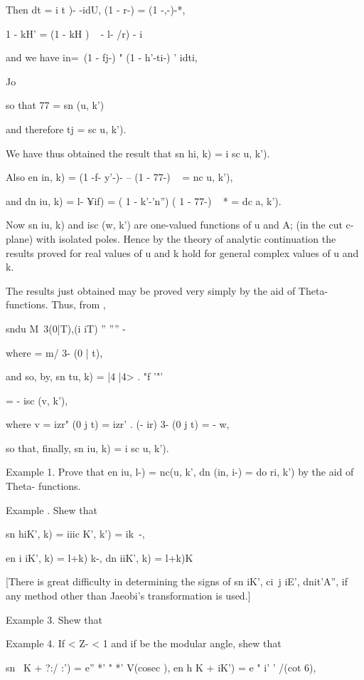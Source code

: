 Then dt = i t )- -idU, (1 - r-) = (1 -,-)-*,

1 - kH' = (1 - kH ) ~ - l- /r) - i

and we have in=\ (1 - fj-) " (1 - h'-ti-) ' idti,

Jo

so that 77 = sn (u, k')

and therefore tj = sc u, k').

We have thus obtained the result that sn hi, k) = i sc u, k').

Also en in, k) = (1 -f- y'-)- -- (1 - 77-) ~ = nc u, k'),

and dn iu, k) = l- ¥if) = ( 1 - k'-'n'') ( 1 - 77-) ~ * = dc a, k').

Now sn iu, k) and isc (w, k') are one-valued functions of u and A; (in
the cut c-plane) with isolated poles. Hence by the theory of analytic
continuation the results proved for real values of u and k hold for
general complex values of u and k.


The results just obtained may be proved very simply by the aid of
Theta-functions. Thus, from ,

sndu M\ 3(0|T),(i iT) '' '''' -%

where = m/ 3- (0 | t),

and so, by, sn tu, k) = |4 |4> . "f '"'

= - isc (v, k'),

where v = izr" (0 j t) = izr' . (- ir) 3- (0 j t) = - w,

so that, finally, sn iu, k) = i sc u, k').

Example 1. Prove that en iu, l-) = nc(u, k', dn (in, i-) = do ri, k')
by the aid of Theta- functions.

Example . Shew that

sn hiK', k) = iiic K', k') = ik~-,

en i iK', k) = l+k) k-, dn iiK', k) = l+k)K

[There is great difficulty in determining the signs of sn iK', ci\ j
iE', dnit'A'', if any method other than Jaeobi's transformation is
used.]

%
%

Example 3. Shew that

Example 4. If < Z- < 1 and if be the modular angle, shew that

sn \ K + ?:/ :') = e'' *' " *' V(cosec ), en h K + iK') = e " i' '
/(cot 6),

